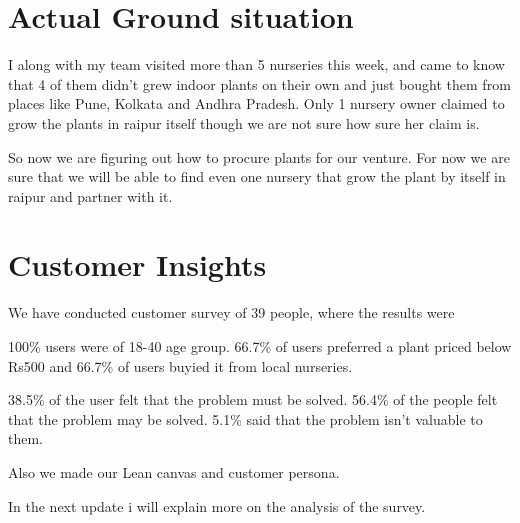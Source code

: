 \documentclass{article}
\begin{document}
\section{Actual Ground situation}

I along with my team visited more than 5 nurseries this week, and came to know that 4 of them didn't grew indoor plants on their own and just bought them from places like Pune, Kolkata and Andhra Pradesh. Only 1 nursery owner claimed to grow the plants in raipur itself though we are not sure how sure her claim is. 

So now we are figuring out how to procure plants for our venture. For now we are sure that we will be able to find even one nursery that grow the plant by itself in raipur and partner with it.


\section{Customer Insights}

We have conducted customer survey of 39 people, where the results were 

100\% users were of 18-40 age group.
66.7\% of users preferred a plant priced below Rs500 and 66.7\% of users buyied it from local nurseries.


38.5\% of the user felt that the problem must be solved.
56.4\% of the people felt that the problem may be solved.
5.1\% said that the problem isn't valuable to them.

Also we made our Lean canvas and customer persona.

In the next update i will explain more on the analysis of the survey.
\end{document}
